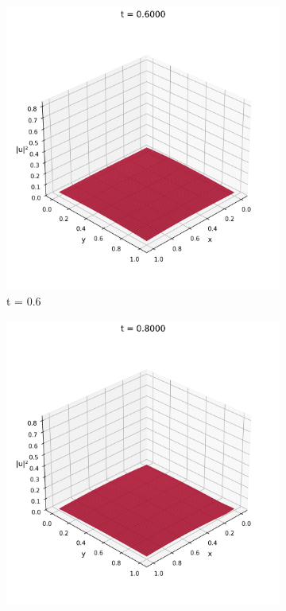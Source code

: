 \documentclass{article}
\theoremstyle{definition}
\theoremstyle{plain}
\theoremstyle{remark}
\begin{document}
\begin{figure}[h]
  \begin{subfigure}[b]{0.3\textwidth}
    \centering
    \includegraphics[width=\textwidth, trim=0cm 0cm 0cm 1cm, clip]{figures/pinn_frame_0030.png}
    \caption{t = 0.6}
  \end{subfigure}
  \hfill
  \begin{subfigure}[b]{0.3\textwidth}
    \centering
    \includegraphics[width=\textwidth, trim=0cm 0cm 0cm 1cm, clip]{figures/pinn_frame_0040.png}

\end{subfigure}
\end{figure}
\end{document}
